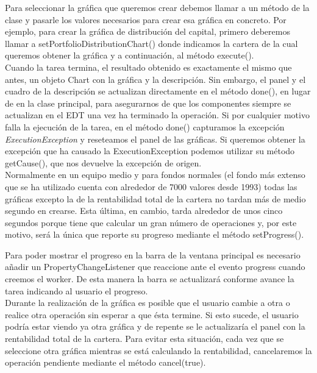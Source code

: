 \documentclass[12pt, a4paper]{book}
\begin{document}
Para seleccionar la gráfica que queremos crear debemos llamar a un método de la clase y pasarle los valores necesarios para crear esa gráfica en concreto. Por ejemplo, para crear la gráfica de distribución del capital, primero deberemos llamar a setPortfolioDistributionChart() donde indicamos la cartera de la cual queremos obtener la gráfica y a continuación, al método execute().\\

Cuando la tarea termina, el resultado obtenido es exactamente el mismo que antes, un objeto Chart con la gráfica y la descripción. Sin embargo, el panel y el cuadro de la descripción se actualizan directamente en el método done(), en lugar de en la clase principal, para asegurarnos de que los componentes siempre se actualizan en el \gls{EDT} una vez ha terminado la operación. Si por cualquier motivo falla la ejecución de la tarea, en el método done() capturamos la excepción \textit{ExecutionException} y reseteamos el panel de las gráficas. Si queremos obtener la excepción que ha causado la ExecutionException podemos utilizar su método getCause(), que nos devuelve la excepción de origen.\\

Normalmente en un equipo medio y para fondos normales (el fondo más extenso que se ha utilizado cuenta con alrededor de 7000 valores desde 1993) todas las gráficas excepto la de la rentabilidad total de la cartera no tardan más de medio segundo en crearse. Esta última, en cambio, tarda alrededor de unos cinco segundos porque tiene que calcular un gran número de operaciones y, por este motivo, será la única que reporte su progreso mediante el método setProgress().\\


\newpage

Para poder mostrar el progreso en la barra de la ventana principal es necesario añadir un PropertyChangeListener que reaccione ante el evento progress cuando creemos el worker. De esta manera la barra se actualizará conforme avance la tarea indicando al usuario el progreso.\\


Durante la realización de la gráfica es posible que el usuario cambie a otra o realice otra operación sin esperar a que ésta termine. Si esto sucede, el usuario podría estar viendo ya otra gráfica y de repente se le actualizaría el panel con la rentabilidad total de la cartera. Para evitar esta situación, cada vez que se seleccione otra gráfica mientras se está calculando la rentabilidad, cancelaremos la operación pendiente mediante el método cancel(true).
\end{document}
